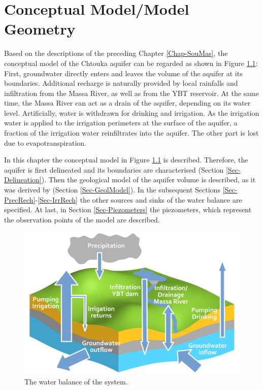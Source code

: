 
\chapter{Conceptual Model/Model Geometry}
\label{Chap-ConcMod}

Based on the descriptions of the preceding Chapter \ref{Chap-SouMas}, the conceptual model of the Chtouka aquifer can be regarded as shown in Figure \ref{Fig-SchemeBalance}: First, groundwater directly enters and leaves the volume of the aquifer at its boundaries. 
Additional recharge is naturally provided by local rainfalls and infiltration from the Massa River, as well as from the YBT reservoir. 
At the same time, the Massa River can act as a drain of the aquifer, depending on its water level. 
Artificially, water is withdrawn for drinking and irrigation. 
As the irrigation water is applied to the irrigation perimeters at the surface of the aquifer, a fraction of the irrigation water reinfiltrates into the aquifer. 
The other part is lost due to evapotranspiration.

In this chapter the conceptual model in Figure \ref{Fig-SchemeBalance} is described. 
Therefore, the aquifer is first delineated and its boundaries are characterised (Section \ref{Sec-Delineation}). 
Then the geological model of the aquifer volume is described, as it was derived by \textcite{Horn.2021} (Section \ref{Sec-GeolModel}). 
In the subsequent Sections \ref{Sec-PrecRech}-\ref{Sec-IrrRech} the other sources and sinks of the water balance are specified. 
At last, in Section \ref{Sec-Piezometers} the piezometers, which represent the observation points of the model are described.

\begin{figure}[h]
    \centering
    \includegraphics[width=1.0\textwidth]{./img/Fig-SchematicBalanceSystem.pdf}
    \caption{The water balance of the system.}
    \label{Fig-SchemeBalance}
\end{figure}

